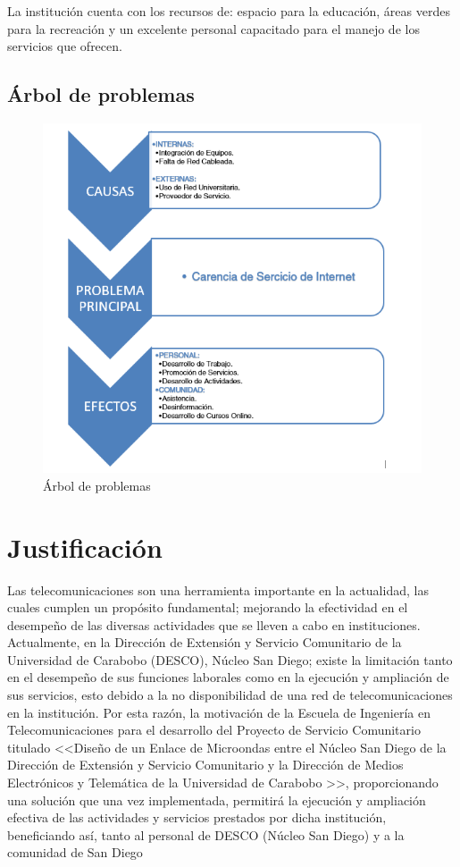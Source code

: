 \documentclass[11pt, a4paper, twosides]{report}
\begin{document}
La institución cuenta con los recursos de: espacio para la educación, áreas verdes para la recreación y un excelente personal capacitado para el manejo de los servicios que ofrecen.

\newpage
\section{Árbol de problemas}

\begin{figure}[H]
    \centering
    \includegraphics[width= 1 \linewidth]{a.png}
    \caption{Árbol de problemas}
    \label{fig:problem_tree}
\end{figure}


\chapter{Justificación}
Las telecomunicaciones son una herramienta importante en la actualidad, las cuales cumplen un propósito fundamental; mejorando la efectividad en el desempeño de las diversas actividades que se lleven a cabo en instituciones. Actualmente, en la Dirección de Extensión y Servicio Comunitario de la Universidad de Carabobo (DESCO), Núcleo San Diego; existe la limitación tanto en el desempeño de sus funciones laborales como en la ejecución y ampliación de sus servicios, esto debido a la no disponibilidad de una red de telecomunicaciones en la institución. Por esta razón, la motivación de la Escuela de Ingeniería en Telecomunicaciones para el desarrollo del Proyecto de Servicio Comunitario titulado <<Diseño de un Enlace de Microondas entre el Núcleo San Diego de la Dirección de Extensión y Servicio Comunitario y la Dirección de Medios Electrónicos y Telemática de la Universidad de Carabobo >>, proporcionando una solución que una vez implementada, permitirá la ejecución y ampliación efectiva de las actividades y servicios prestados por dicha institución, beneficiando así, tanto al personal de DESCO (Núcleo San Diego) y a la comunidad de San Diego
\end{document}

